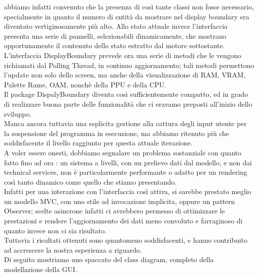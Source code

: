 \documentclass[11pt]{article}
\begin{document}
abbiamo infatti convenuto che la presenza di così tante classi non fosse necessario, specialmente in quanto il numero di entità da mostrare nel display boundary era diventato
vertiginosamente più alto. Allo stato attuale invece l'interfaccia presenta una serie di pannelli, selezionabili dinamicamente, che mostrano opportunamente il contenuto dello stato
estratto dal motore sottostante.\\ 

L'interfaccia DisplayBoundary prevede ora una serie di metodi che le vengono richiamati dal Polling Thread, in continuo aggiornamento; tali metodi
permettono l'update non solo dello screen, ma anche della visualizzazione di RAM, VRAM, Palette Rame, OAM, nonchè della PPU e della CPU.\\

Il package DispalyBoundary diventa così sufficientemente compatto, ed in grado di realizzare buona parte delle funzionalità che ci eravamo preposti all'inizio dello sviluppo.\\
Manca ancora tuttavia una esplicita gestione alla cattura degli input utente per la sospensione del programma in esecuzione, ma abbiamo ritenuto più che soddisfacente il livello raggiunto per questa attuale iterazione.\\

A voler essere onesti, dobbiamo segnalare un problema sostanziale con quanto fatto fino ad ora : un sistema a livelli, con un prelievo dati dal modello, e non dai technical services, non è particolarmente performante o adatto per un rendering così tanto dinamico come quello che stiamo presentando.\\
Infatti per una interazione con l'interfaccia così attiva, si sarebbe prestato meglio un modello MVC, con uno stile ad invocazione implicita, oppure un pattern Observer; scelte asincrone infatti ci avrebbero permesso di ottimizzare le prestazioni e rendere l'aggiornamento dei dati meno convoluto e farraginoso di quanto invece non ci sia risultato.\\

Tuttavia i risultati ottenuti sono quantomeno soddisfacenti, e hanno contribuito ad accrescere la nostra esperienza a riguardo.\\

Di seguito mostriamo uno spaccato del class diagram, completo della modellazione della GUI.
\end{document}
